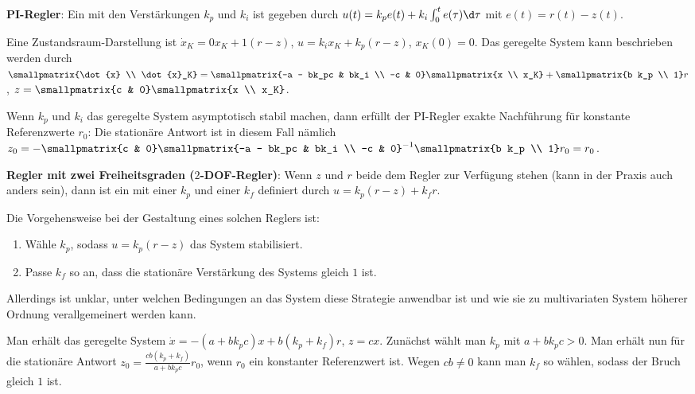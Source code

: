 \linie

\textbf{PI-Regler}:
Ein 
mit den Verstärkungen $k_p$ und $k_i$ ist gegeben durch
$u(t) = k_p e(t) + k_i \int_0^t e(\tau)\d\tau$ mit $e(t) = r(t) - z(t)$.

Eine Zustandsraum-Darstellung ist $\dot{x}_K = 0x_K + 1(r - z)$,
$u = k_i x_K + k_p(r - z)$, $x_K(0) = 0$.
Das geregelte System kann beschrieben werden durch
$\smallpmatrix{\dot{x} \\ \dot{x}_K} = \smallpmatrix{-a - bk_pc & bk_i \\ -c & 0}
\smallpmatrix{x \\ x_K} + \smallpmatrix{b k_p \\ 1} r$,
$z = \smallpmatrix{c & 0} \smallpmatrix{x \\ x_K}$.

Wenn $k_p$ und $k_i$ das geregelte System asymptotisch stabil machen, dann erfüllt der
PI-Regler exakte Nachführung für konstante Referenzwerte $r_0$:
Die stationäre Antwort ist in diesem Fall nämlich
$z_0 = -\smallpmatrix{c & 0} \smallpmatrix{-a - bk_pc & bk_i \\ -c & 0}^{-1}
\smallpmatrix{b k_p \\ 1} r_0 = r_0$.

\linie

\textbf{Regler mit zwei Freiheitsgraden ($2$-DOF-Regler)}:
Wenn $z$ und $r$ beide dem Regler zur Verfügung stehen (kann in der Praxis auch anders sein),
dann ist ein  mit einer
 $k_p$ und einer
 $k_f$ definiert durch
$u = k_p (r - z) + k_f r$.

Die Vorgehensweise bei der Gestaltung eines solchen Reglers ist:
\begin{enumerate}
    \item
    Wähle $k_p$, sodass $u = k_p (r - z)$ das System stabilisiert.

    \item
    Passe $k_f$ so an, dass die stationäre Verstärkung des Systems gleich $1$ ist.
\end{enumerate}
Allerdings ist unklar, unter welchen Bedingungen an das System diese Strategie anwendbar ist und
wie sie zu multivariaten System höherer Ordnung verallgemeinert werden kann.

Man erhält das geregelte System $\dot{x} = -(a + bk_p c)x + b (k_p + k_f) r$, $z = cx$.
Zunächst wählt man $k_p$ mit $a + bk_p c > 0$.
Man erhält nun für die stationäre Antwort $z_0 = \frac{cb (k_p + k_f)}{a + bk_p c} r_0$,
wenn $r_0$ ein konstanter Referenzwert ist.
Wegen $cb \not= 0$ kann man $k_f$ so wählen, sodass der Bruch gleich $1$ ist.

